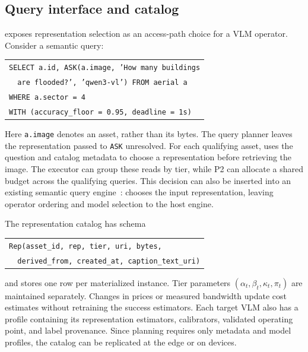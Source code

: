 \subsection{Query interface and catalog}

\system exposes representation selection as an access-path choice for a VLM
operator. Consider a semantic query:
\begin{center}
\footnotesize
\begin{tabular}{l}
\texttt{SELECT a.id, ASK(a.image, 'How many buildings}\\
\texttt{\ \ are flooded?', 'qwen3-vl') FROM aerial a}\\
\texttt{WHERE a.sector = 4}\\
\texttt{WITH (accuracy\_floor = 0.95, deadline = 1s)}
\end{tabular}
\end{center}

Here \texttt{a.image} denotes an asset, rather than its bytes. The query
planner leaves the representation passed to \texttt{ASK} unresolved. For each
qualifying asset, \system uses the question and catalog metadata to choose a
representation before retrieving the image. The executor can group these
reads by tier, while P2 can allocate a shared budget across the qualifying
queries. This decision can also be inserted into an existing semantic query
engine~\cite{patel2024lotus,liu2025palimpzest}: \system chooses the input
representation, leaving operator ordering and model selection to the host
engine.

The representation catalog has schema
\begin{center}
\footnotesize
\begin{tabular}{l}
\texttt{Rep(asset\_id, rep, tier, uri, bytes,}\\
\texttt{\ \ derived\_from, created\_at, caption\_text\_uri)}
\end{tabular}
\end{center}
and stores one row per materialized instance. Tier parameters
$(\alpha_t,\beta_t,\kappa_t,\pi_t)$ are maintained separately. Changes in
prices or measured bandwidth update cost estimates without retraining the
success estimators. Each target VLM also has a profile containing its
representation estimators, calibrators, validated operating point, and label
provenance. Since planning requires only metadata and model profiles, the
catalog can be replicated at the edge or on devices.


